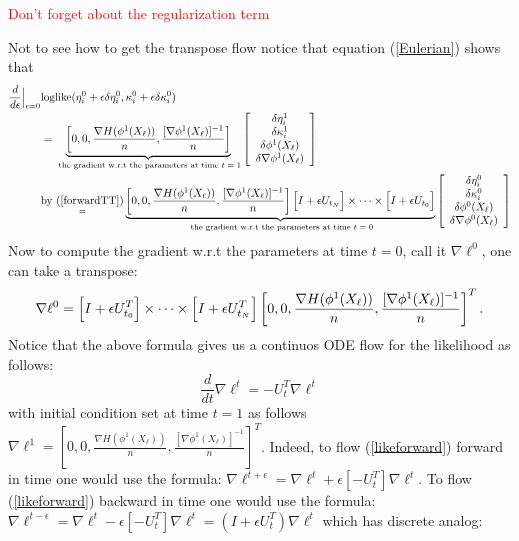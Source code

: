 \documentclass[noinfoline]{imsart}
\begin{document}
{\textcolor{red}{Don't forget about the regularization term}

Not to see how to get the transpose flow notice that equation (\ref{Eulerian}) shows that
\begin{align*}
\frac{d}{d\epsilon}\Bigr|_{\epsilon = 0}& \text{loglike}(\eta_i^0+\epsilon \delta \eta_i^0, \kappa^0_i+\epsilon \delta \kappa_i^0) \\
&=\underbrace{ \left[ 0,0,\frac{\nabla H (\phi^1(X_\ell))}{n}, \frac{[\nabla\phi^1(X_\ell)]^{-1}}{n}  \right]}_{\text{ the gradient w.r.t the parameters at time $t=1$}} \left[\begin{array}{c} \delta\eta^1_i\\ \delta \kappa^1_i \\ \delta\phi^1(X_\ell) \\ \delta \nabla\phi^1(X_\ell)   \end{array}\right] \\
&\underset{=}{ \text{by (\ref{forwardTT})}} \underbrace{ \left[ 0,0,\frac{\nabla H (\phi^1(X_\ell))}{n}, \frac{[\nabla\phi^1(X_\ell)]^{-1}}{n}  \right] \Bigl[I+\epsilon U_{t_N} \Bigr]\times \cdots \times  \Bigl[I+\epsilon U_{t_0} \Bigr] }_{\text{ the gradient w.r.t the parameters at time $t=0$}}  \left[\begin{array}{c} \delta\eta^0_i\\ \delta \kappa^0_i \\ \delta\phi^0(X_\ell) \\ \delta \nabla\phi^0(X_\ell)   \end{array}\right]
\end{align*}
Now to compute the gradient w.r.t the parameters at time $t=0$, call it $\nabla \ell^0$, one can take a transpose:
\begin{equation}
\label{oouoo}
\nabla \ell^0 =\Bigl[I+\epsilon U_{t_0}^T \Bigr]\times \cdots \times \Bigl[I+\epsilon U_{t_N}^T \Bigr] \left[ 0,0,\frac{\nabla H (\phi^1(X_\ell))}{n}, \frac{[\nabla\phi^1(X_\ell)]^{-1}}{n}  \right]^T.  
\end{equation}
Notice that the above formula gives us a continuos ODE flow for the likelihood as follows:
\begin{equation}
\label{likeforward} 
\frac{d}{dt} \nabla\ell^t = -U_t^T   \nabla\ell^t
\end{equation}
with initial condition set at time $t=1$ as follows $ \nabla\ell^1 = \left[ 0,0,\frac{\nabla H (\phi^1(X_\ell))}{n}, \frac{[\nabla\phi^1(X_\ell)]^{-1}}{n}  \right]^T$. Indeed, to flow (\ref{likeforward}) forward in time one would use the formula: $\nabla \ell^{t+\epsilon} = \nabla \ell^{t} + \epsilon  [-U_t^T]   \nabla\ell^t$. To flow  (\ref{likeforward}) backward in time one would use the formula: $\nabla \ell^{t-\epsilon} = \nabla \ell^{t} - \epsilon  [-U_t^T]   \nabla\ell^t = (I + \epsilon  U_t^T)  \nabla\ell^t$ which has discrete analog:
}
\end{document}
